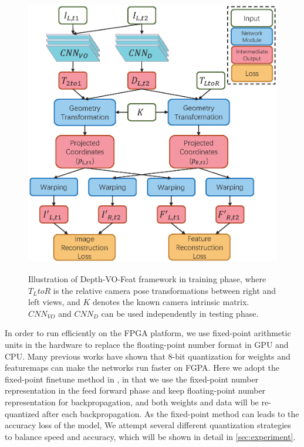\begin{figure}[thb]  
    \centering  
    {\includegraphics[width=0.95\linewidth]{fig/depth_vo_feat.eps}\label{fig:dvo}}
    \caption{Illustration of Depth-VO-Feat framework in training phase, where $T_LtoR$ is the relative camera pose transformations between right and left views, and $K$ denotes the known camera intrinsic matrix. $CNN_{VO}$ and $CNN_D$ can be used independently in testing phase. }
\end{figure}

In order to run efficiently on the FPGA platform, we use fixed-point arithmetic units in the hardware to replace the floating-point number format in GPU and CPU. Many previous works have shown that 8-bit quantization for weights and featuremaps can make the networks run faster on FGPA. Here we adopt the fixed-point finetune method in \cite{Yu:2018:IDC:3299999.3283452}, in that we use the fixed-point number representation in the feed forward phase and keep floating-point number representation for backpropagation, and both weights and data will be re-quantized after each backpropagation. As the fixed-point method can leads to the accuracy loss of the model, We attempt several different quantization strategies to balance speed and accuracy, which will be shown in detail in \cref{sec:experiment}.

